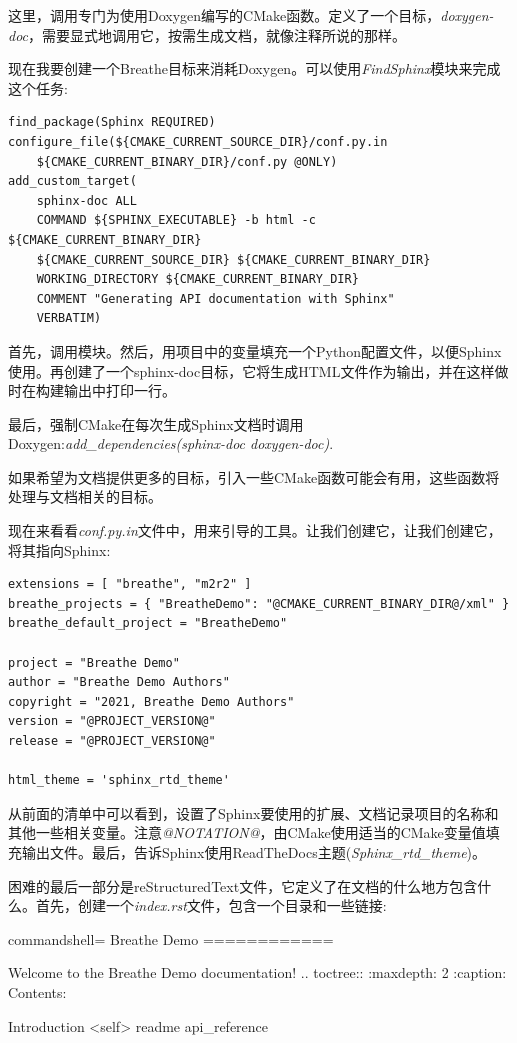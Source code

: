 这里，调用专门为使用Doxygen编写的CMake函数。定义了一个目标，\textit{doxygen-doc}，需要显式地调用它，按需生成文档，就像注释所说的那样。

现在我要创建一个Breathe目标来消耗Doxygen。可以使用\textit{FindSphinx}模块来完成这个任务:

\begin{lstlisting}[style=styleCMake]
find_package(Sphinx REQUIRED)
configure_file(${CMAKE_CURRENT_SOURCE_DIR}/conf.py.in
	${CMAKE_CURRENT_BINARY_DIR}/conf.py @ONLY)
add_custom_target(
	sphinx-doc ALL
	COMMAND ${SPHINX_EXECUTABLE} -b html -c ${CMAKE_CURRENT_BINARY_DIR}
	${CMAKE_CURRENT_SOURCE_DIR} ${CMAKE_CURRENT_BINARY_DIR}
	WORKING_DIRECTORY ${CMAKE_CURRENT_BINARY_DIR}
	COMMENT "Generating API documentation with Sphinx"
	VERBATIM)
\end{lstlisting}

首先，调用模块。然后，用项目中的变量填充一个Python配置文件，以便Sphinx使用。再创建了一个sphinx-doc目标，它将生成HTML文件作为输出，并在这样做时在构建输出中打印一行。

最后，强制CMake在每次生成Sphinx文档时调用Doxygen:\textit{add\_dependencies(sphinx-doc doxygen-doc)}.

如果希望为文档提供更多的目标，引入一些CMake函数可能会有用，这些函数将处理与文档相关的目标。

现在来看看\textit{conf.py.in}文件中，用来引导的工具。让我们创建它，让我们创建它，将其指向Sphinx:

\begin{lstlisting}[style=stylePython]
extensions = [ "breathe", "m2r2" ]
breathe_projects = { "BreatheDemo": "@CMAKE_CURRENT_BINARY_DIR@/xml" }
breathe_default_project = "BreatheDemo"

project = "Breathe Demo"
author = "Breathe Demo Authors"
copyright = "2021, Breathe Demo Authors"
version = "@PROJECT_VERSION@"
release = "@PROJECT_VERSION@"

html_theme = 'sphinx_rtd_theme'
\end{lstlisting}

从前面的清单中可以看到，设置了Sphinx要使用的扩展、文档记录项目的名称和其他一些相关变量。注意\textit{@NOTATION@}，由CMake使用适当的CMake变量值填充输出文件。最后，告诉Sphinx使用ReadTheDocs主题(\textit{Sphinx\_rtd\_theme})。

困难的最后一部分是reStructuredText文件，它定义了在文档的什么地方包含什么。首先，创建一个\textit{index.rst}文件，包含一个目录和一些链接:

\begin{tcblisting}{commandshell={}}
Breathe Demo
============

Welcome to the Breathe Demo documentation!
.. toctree::
    :maxdepth: 2
    :caption: Contents:
   
Introduction <self>
    readme
    api_reference
\end{tcblisting}

